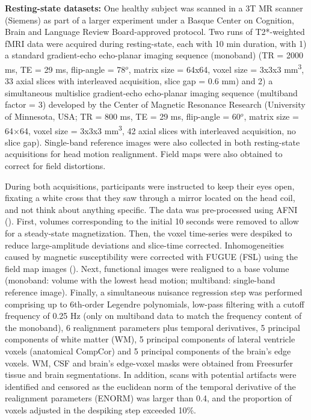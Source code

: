 \textbf{Resting-state datasets:} One healthy subject was scanned in a 3T MR scanner (Siemens) as part of a larger experiment under a Basque Center on Cognition, Brain and Language Review Board-approved protocol. Two runs of T2*-weighted fMRI data were acquired during resting-state, each with 10 min duration, with 1) a standard gradient-echo echo-planar imaging sequence (monoband) (TR = 2000 ms, TE = 29 ms, flip-angle = 78\(^o\), matrix size = 64x64, voxel size = 3x3x3 mm\textsuperscript{3}, 33 axial slices with interleaved acquisition, slice gap = 0.6 mm) and 2) a simultaneous multislice gradient-echo echo-planar imaging sequence (multiband factor = 3) developed by the Center of Magnetic Resonance Research (University of Minnesota, USA; TR = 800 ms, TE = 29 ms, flip-angle = 60\(^o\), matrix size = 64×64, voxel size = 3x3x3 mm\textsuperscript{3}, 42 axial slices with interleaved acquisition, no slice gap). Single-band reference images were also collected in both resting-state acquisitions for head motion realignment. Field maps were also obtained to correct for field distortions.

During both acquisitions, participants were instructed to keep their eyes open, fixating a white cross that they saw through a mirror located on the head coil, and not think about anything specific. The data was pre-processed using AFNI (\citealt{cox1996afni}). First, volumes corresponding to the initial 10 seconds were removed to allow for a steady-state magnetization. Then, the voxel time-series were despiked to reduce large-amplitude deviations and slice-time corrected. Inhomogeneities caused by magnetic susceptibility were corrected with FUGUE (FSL) using the field map images (\citealt{jenkinson2012fsl}). Next, functional images were realigned to a base volume (monoband: volume with the lowest head motion; multiband: single-band reference image). Finally, a simultaneous nuisance regression step was performed comprising up to 6th-order Legendre polynomials, low-pass filtering with a cutoff frequency of 0.25 Hz (only on multiband data to match the frequency content of the monoband), 6 realignment parameters plus temporal derivatives, 5 principal components of white matter (WM), 5 principal components of lateral ventricle voxels (anatomical CompCor) and 5 principal components of the brain's edge voxels. WM, CSF and brain's edge-voxel masks were obtained from Freesurfer tissue and brain segmentations. In addition, scans with potential artifacts were identified and censored as the euclidean norm of the temporal derivative of the realignment parameters (ENORM) was larger than 0.4, and the proportion of voxels adjusted in the despiking step exceeded 10\%.

